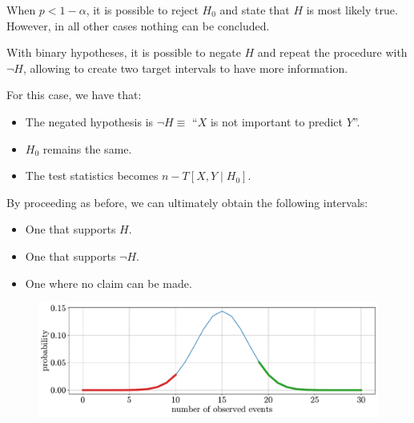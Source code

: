 \begin{remark}
    When $p < 1-\alpha$, it is possible to reject $H_0$ and state that $H$ is most likely true. However, in all other cases nothing can be concluded. 

    With binary hypotheses, it is possible to negate $H$ and repeat the procedure with $\lnot H$, allowing to create two target intervals to have more information.
\end{remark}

\begin{example}
    For this case, we have that:
    \begin{itemize}
        \item The negated hypothesis is $\lnot H \equiv$ ``$X$ is not important to predict $Y$''.
        \item $H_0$ remains the same.
        \item The test statistics becomes $n - T[X, Y \mid H_0]$.
    \end{itemize}
    
    By proceeding as before, we can ultimately obtain the following intervals:
    \begin{itemize}
        \item One that supports $H$.
        \item One that supports $\lnot H$.
        \item One where no claim can be made.
    \end{itemize}

    \begin{figure}[H]
        \centering
        \includegraphics[width=0.6\linewidth]{./img/_biomed_pvalue_two_tails.pdf}
    \end{figure}
\end{example}


